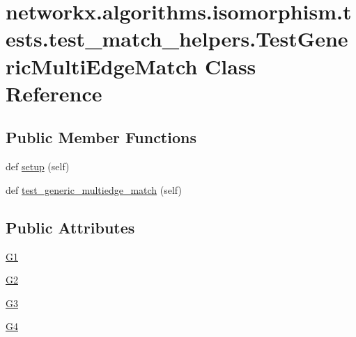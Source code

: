 \hypertarget{classnetworkx_1_1algorithms_1_1isomorphism_1_1tests_1_1test__match__helpers_1_1TestGenericMultiEdgeMatch}{}\section{networkx.\+algorithms.\+isomorphism.\+tests.\+test\+\_\+match\+\_\+helpers.\+Test\+Generic\+Multi\+Edge\+Match Class Reference}
\label{classnetworkx_1_1algorithms_1_1isomorphism_1_1tests_1_1test__match__helpers_1_1TestGenericMultiEdgeMatch}
\subsection*{Public Member Functions}
\begin{DoxyCompactItemize}
\item 
def \hyperlink{classnetworkx_1_1algorithms_1_1isomorphism_1_1tests_1_1test__match__helpers_1_1TestGenericMultiEdgeMatch_a4351e8644d4281639872cab062074aed}{setup} (self)
\item 
def \hyperlink{classnetworkx_1_1algorithms_1_1isomorphism_1_1tests_1_1test__match__helpers_1_1TestGenericMultiEdgeMatch_ab1a4e2843c850fa0ab03b516e13938a8}{test\+\_\+generic\+\_\+multiedge\+\_\+match} (self)
\end{DoxyCompactItemize}
\subsection*{Public Attributes}
\begin{DoxyCompactItemize}
\item 
\hyperlink{classnetworkx_1_1algorithms_1_1isomorphism_1_1tests_1_1test__match__helpers_1_1TestGenericMultiEdgeMatch_aaf53ef9cd6b0b069fa9a14c5a9cc5c6a}{G1}
\item 
\hyperlink{classnetworkx_1_1algorithms_1_1isomorphism_1_1tests_1_1test__match__helpers_1_1TestGenericMultiEdgeMatch_a181ee500f9afb0002ce1af5be35e40c3}{G2}
\item 
\hyperlink{classnetworkx_1_1algorithms_1_1isomorphism_1_1tests_1_1test__match__helpers_1_1TestGenericMultiEdgeMatch_a3d2f168c138c1370453bdd0abe7e11ba}{G3}
\item 
\hyperlink{classnetworkx_1_1algorithms_1_1isomorphism_1_1tests_1_1test__match__helpers_1_1TestGenericMultiEdgeMatch_a71ed6c5bf46edf8e44e3560fbe2886fc}{G4}
\end{DoxyCompactItemize}


